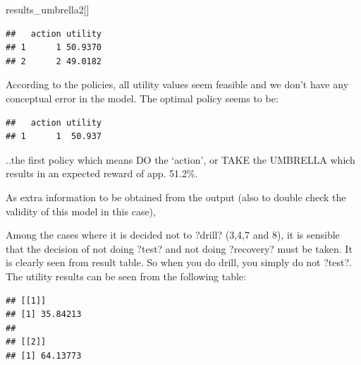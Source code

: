 \documentclass[
]{article}
\newenvironment{Shaded}{\begin{snugshade}}{\end{snugshade}}
\newcommand{\ControlFlowTok}[1]{\textcolor[rgb]{0.13,0.29,0.53}{\textbf{#1}}}
\newcommand{\FunctionTok}[1]{\textcolor[rgb]{0.00,0.00,0.00}{#1}}
\newcommand{\NormalTok}[1]{#1}
\newcommand{\SpecialCharTok}[1]{\textcolor[rgb]{0.00,0.00,0.00}{#1}}
\newcommand{\StringTok}[1]{\textcolor[rgb]{0.31,0.60,0.02}{#1}}
\begin{document}
\begin{Shaded}
\begin{Highlighting}[]
\NormalTok{results\_umbrella2[]}
\end{Highlighting}
\end{Shaded}

\begin{verbatim}
##   action utility
## 1      1 50.9370
## 2      2 49.0182
\end{verbatim}

According to the policies, all utility values seem feasible and we don't have any conceptual error in the model.
The optimal policy seems to be:

\begin{Shaded}
\end{Shaded}

\begin{verbatim}
##   action utility
## 1      1  50.937
\end{verbatim}

..the first policy which means DO the `action', or TAKE the UMBRELLA which results in an expected reward of app. 51.2\%.

As extra information to be obtained from the output (also to double check the validity of this model in this case),

Among the cases where it is decided not to ?drill? (3,4,7 and 8), it is sensible that the decision of not doing ?test? and not doing ?recovery? must be taken. It is clearly seen from result table.
So when you do drill, you simply do not ?test?. The utility results can be seen from the following table:

\begin{Shaded}
\end{Shaded}

\begin{verbatim}
## [[1]]
## [1] 35.84213
## 
## [[2]]
## [1] 64.13773
\end{verbatim}
\end{document}
